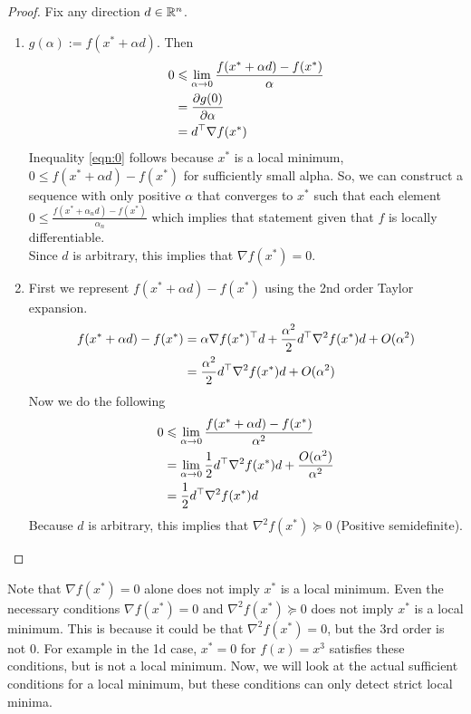 \begin{proof}
Fix any direction $d \in \mathbb{R}^n$.
\begin{enumerate}
    \item $g(\alpha) := f(x^* + \alpha d)$. Then
    \begin{align}
        0 &\leqslant \lim_{\alpha \to 0} \frac{f(x^* + \alpha d) - f(x^*)}{\alpha} \label{eqn:0}\\
        &= \frac{\partial g(0)}{\partial \alpha} \nonumber\\
        &= d^\top \nabla f(x^*) \nonumber
    \end{align}
    Inequality \ref{eqn:0} follows because $x^*$ is a local minimum, $0 \le f(x^* + \alpha d) - f(x^*)$ for sufficiently small alpha. So, we can construct a sequence with only positive $\alpha$ that converges to $x^*$ such that each element $0 \le \frac{f(x^* + \alpha_n d) - f(x^*)}{\alpha_n}$ which implies that statement given that $f$ is locally differentiable.\\
    \newline
    Since $d$ is arbitrary, this implies that $\nabla f(x^*) = 0$.
    \item First we represent $f(x^* + \alpha d) - f(x^*)$ using the 2nd order Taylor expansion.
    \begin{align*}
        f(x^* + \alpha d) - f(x^*) &= \alpha \nabla f(x^*)^\top d + \frac{\alpha^2}{2}d^\top \nabla^2 f(x^*)d + O(\alpha^2) \nonumber\\
        &= \frac{\alpha^2}{2} d^\top \nabla^2 f(x^*) d + O(\alpha^2)\\
    \end{align*}
    Now we do the following
    \begin{align*}
        0 &\leqslant \lim_{\alpha \to 0} \frac{f(x^* + \alpha d) - f(x^*)}{\alpha^2}\\
        &= \lim_{\alpha \to 0} \frac{1}{2}d^\top \nabla^2 f(x^*) d + \frac{O(\alpha^2)}{\alpha^2}\\
        &= \frac{1}{2}d^\top \nabla^2 f(x^*) d
    \end{align*}
    Because $d$ is arbitrary, this implies that $\nabla^2 f(x^*) \succeq 0$ (Positive semidefinite).
    
\end{enumerate}
\end{proof}

Note that $\nabla f(x^*) = 0$ alone does not imply $x^*$ is a local minimum. Even the necessary conditions $\nabla f(x^*) = 0$ and $\nabla^2 f(x^*) \succeq 0$ does not imply $x^*$ is a local minimum. This is because it could be that $\nabla^2 f(x^*) = 0$, but the 3rd order is not 0. For example in the 1d case, $x^* = 0$ for $f(x) = x^3$ satisfies these conditions, but is not a local minimum. Now, we will look at the actual sufficient conditions for a local minimum, but these conditions can only detect strict local minima.

